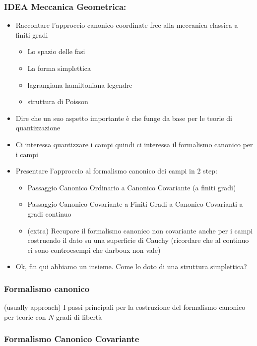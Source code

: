 \documentclass{beamer}
\begin{document}
		\begin{frame}
		\frametitle{IDEA Meccanica Geometrica:}
			\begin{itemize}
				\item<1-> Raccontare l'approccio canonico coordinate free alla meccanica classica a finiti gradi
					\begin{itemize}
						\item Lo spazio delle fasi
						\item La forma simplettica
						\item lagrangiana hamiltoniana legendre
						\item struttura di Poisson
					\end{itemize}
				\item<1-> Dire che un suo aspetto importante è che funge da base per le teorie di quantizzazione
				\item<1-> Ci interessa quantizzare i campi quindi ci interessa il formalismo canonico per i campi
				\item<2-> Presentare l'approccio al formalismo canonico dei campi in 2 step:
					\begin{itemize}
						\item Passaggio Canonico Ordinario a Canonico Covariante (a finiti gradi)
						\item Passaggio Canonico Covariante a Finiti Gradi a Canonico Covarianti a gradi continuo
						\item (extra) Recupare il formalismo canonico non covariante anche per i campi costruendo il dato su una superficie di Cauchy (ricordare che al continuo ci sono controesempi che darboux non vale)
					\end{itemize}
				\item<3-> Ok, fin qui abbiamo un insieme. Come lo doto di una struttura simplettica?
			\end{itemize}
	\end{frame}
	
	\begin{frame}
	\frametitle{Formalismo canonico}
		(usually approach) I passi principali per la costruzione del formalismo canonico per teorie con $N$ gradi di libertà

		\end{frame}
		
		\begin{frame}
			\frametitle{Formalismo Canonico Covariante}
		
		\end{frame}
	
\end{document}
